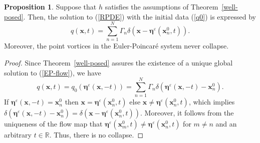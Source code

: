 \documentclass{article}
\theoremstyle{definition}
\newtheorem{proposition}[theorem]{Proposition}
\begin{document}
\begin{proposition}
Suppose that $h$ satisfies the assumptions of Theorem~\ref{well-posed}. Then, the solution to (\ref{RPDE}) with the initial data (\ref{q0}) is expressed by
\begin{equation}
q({\bm x}, t) = \sum_{n=1}^N \Gamma_n \delta( {\bm x} - {\bm \eta}^\varepsilon({\bm x}_n^0, t ) ).  \label{q_sol}
\end{equation}
Moreover, the point vortices in the Euler-Poincar\'{e} system never collapse. \label{pv-solution}
\end{proposition}

\begin{proof}
Since Theorem~\ref{well-posed} assures the  existence of a unique global solution to (\ref{EP-flow}), we have
\begin{equation*}
q({\bm x}, t) = q_0({\bm \eta}^\varepsilon({\bm x}, -t)) = \sum_{n=1}^N \Gamma_n \delta( {\bm \eta}^\varepsilon({\bm x}, -t) - {\bm x}_n^0 ).
\end{equation*}
If ${\bm \eta}^\varepsilon({\bm x}, -t) = {\bm x}_n^0$ then ${\bm x} = {\bm \eta}^\varepsilon({\bm x}_n^0, t)$ else ${\bm x} \neq {\bm \eta}^\varepsilon({\bm x}_n^0, t)$, which implies
$\delta( {\bm \eta}^\varepsilon({\bm x}, -t) - {\bm x}_n^0 ) = \delta( {\bm x} - {\bm \eta}^\varepsilon({\bm x}_n^0, t) )$.
Moreover, it follows from the uniqueness of the flow map that ${\bm \eta}^\varepsilon({\bm x}_m^0, t) \neq {\bm \eta}^\varepsilon({\bm x}_n^0, t)$ for $m \neq n$ and an arbitrary $t \in \mathbb{R}$. Thus, there is no collapse. 
\end{proof}
\end{document}
